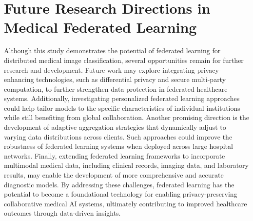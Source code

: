 \documentclass[12pt]{book}
\begin{document}
\section{Future Research Directions in Medical Federated Learning}
Although this study demonstrates the potential of federated learning for distributed medical image classification, several opportunities remain for further research and development.
Future work may explore integrating privacy-enhancing technologies, such as differential privacy and secure multi-party computation, to further strengthen data protection in federated healthcare systems. Additionally, investigating personalized federated learning approaches could help tailor models to the specific characteristics of individual institutions while still benefiting from global collaboration.
Another promising direction is the development of adaptive aggregation strategies that dynamically adjust to varying data distributions across clients. Such approaches could improve the robustness of federated learning systems when deployed across large hospital networks.
Finally, extending federated learning frameworks to incorporate multimodal medical data, including clinical records, imaging data, and laboratory results, may enable the development of more comprehensive and accurate diagnostic models.
By addressing these challenges, federated learning has the potential to become a foundational technology for enabling privacy-preserving collaborative medical AI systems, ultimately contributing to improved healthcare outcomes through data-driven insights.



\end{document}
